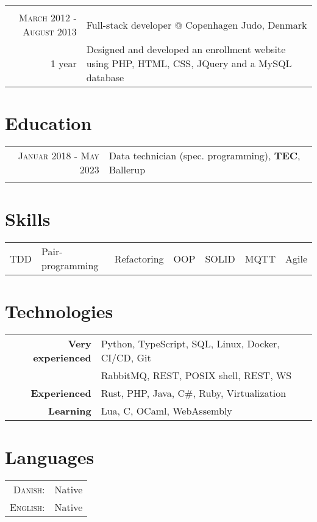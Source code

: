 \documentclass[a4paper,10pt]{article}
\begin{document}
\begin{tabular}{r|p{11cm}}
	\multicolumn{2}{c}{}                                                                       \\
	\textsc{March 2012 - August 2013}      & Full-stack developer @ Copenhagen Judo, Denmark   \\ \footnotesize{1 year}&\footnotesize{Designed and developed an enrollment website using PHP, HTML, CSS, JQuery and a MySQL database}\\
\end{tabular}

\section{Education}
\begin{tabular}{rl}
	\textsc{Januar 2018 - May 2023} & Data technician (spec. programming), \textbf{TEC}, Ballerup \\ & \\
\end{tabular}

\section{Skills}
\begin{tabular}{lllllll}
	TDD & Pair-programming & Refactoring & OOP & SOLID & MQTT & Agile \\
\end{tabular}

\section{Technologies}
\begin{tabular}{rl}
	\textbf{Very experienced} & Python, TypeScript, SQL, Linux, Docker, CI/CD, Git \\
	                          & RabbitMQ, REST, POSIX shell, REST, WS              \\
	\textbf{Experienced}      & Rust, PHP, Java, C\#, Ruby, Virtualization         \\
	\textbf{Learning}         & Lua, C, OCaml, WebAssembly
\end{tabular}

\section{Languages}
\begin{tabular}{rl}
	\textsc{Danish:}  & Native \\
	\textsc{English:} & Native \\
\end{tabular}
\end{document}
